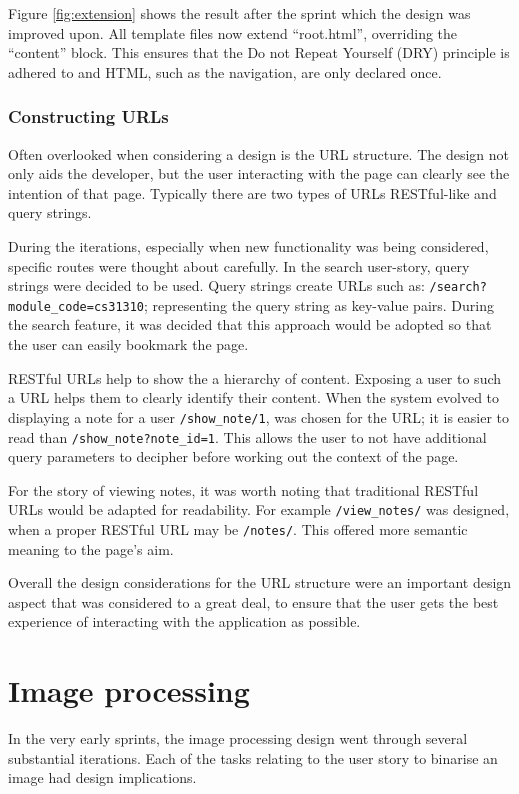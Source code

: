 Figure \ref{fig:extension} shows the result after the sprint which the design was improved upon. All template files now extend ``root.html'', overriding the ``content'' block. This ensures that the Do not Repeat Yourself (DRY) principle is adhered to and HTML, such as the navigation, are only declared once.

\subsubsection{Constructing URLs}
Often overlooked when considering a design is the URL structure. The design not only aids the developer, but the user interacting with the page can clearly see the intention of that page. Typically there are two types of URLs RESTful-like and query strings.

During the iterations, especially when new functionality was being considered, specific routes were thought about carefully. In the search user-story, query strings were decided to be used. Query strings create URLs such as: \texttt{/search?module\_code=cs31310}; representing the query string as key-value pairs. During the search feature, it was decided that this approach would be adopted so that the user can easily bookmark the page.

RESTful URLs help to show the a hierarchy of content. Exposing a user to such a URL helps them to clearly identify their content. When the system evolved to displaying a note for a user \texttt{/show\_note/1}, was chosen for the URL; it is easier to read than  \texttt{/show\_note?note\_id=1}. This allows the user to not have additional query parameters to decipher before working out the context of the page.

For the story of viewing notes, it was worth noting that traditional RESTful URLs would be adapted for readability. For example \texttt{/view\_notes/} was designed, when a proper RESTful URL may be \texttt{/notes/}. This offered more semantic meaning to the page's aim.

Overall the design considerations for the URL structure were an important design aspect that was considered to a great deal, to ensure that the user gets the best experience of interacting with the application as possible.

\section{Image processing}
In the very early sprints, the image processing design went through several substantial iterations. Each of the tasks relating to the user story to binarise an image had design implications.

